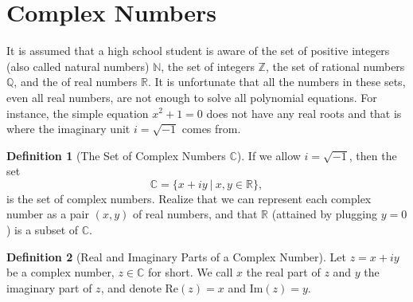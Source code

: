 \documentclass[12pt,a4paper]{memoir}
\theoremstyle{definition}
\newtheorem*{definition}{Definition}
\begin{document}
\newpage
% 
\section{Complex Numbers}

\begin{tcolorbox}[title={Introduction to Complex Numbers}]
	It is assumed that a high school student is aware of the set of positive integers (also called natural numbers) $\mathbb N$, the set of integers $\mathbb Z$, the set of rational numbers $\mathbb Q$, and the of real numbers $\mathbb R$.  It is unfortunate that all the numbers in these sets, even all real numbers, are not enough to solve all polynomial equations. For instance, the simple equation $x^2+1=0$ does not have any real roots and that is where the imaginary unit $i=\sqrt{-1}$ comes from.
	\begin{definition}[The Set of Complex Numbers $\mathbb C$]
		If we allow $i=\sqrt{-1}$, then the set
		\[\mathbb C = \{x+iy \ | \ x,y \in\mathbb R\},\]
		is the set of complex numbers. Realize that we can represent each complex number as a pair $(x,y)$ of real numbers, and that $\mathbb R$ (attained by plugging $y=0$) is a subset of $\mathbb C$.
	\end{definition}
	
	\begin{definition}[Real and Imaginary Parts of a Complex Number]
		Let $z=x+iy$ be a complex number, $z\in\mathbb C$ for short. We call $x$ the real part of $z$ and $y$ the imaginary part of $z$, and denote $\text{Re}(z)=x$ and $\text{Im}(z)=y$.
	\end{definition}
	

\end{tcolorbox}
\end{document}
